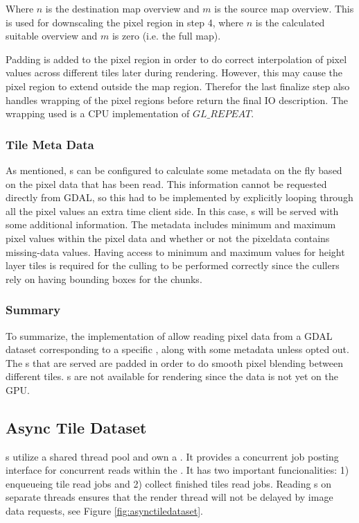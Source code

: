 Where $n$ is the destination map overview and $m$ is the source map overview. This is used for downscaling the pixel region in step 4, where $n$ is the calculated suitable overview and $m$ is zero (i.e. the full map). 

Padding is added to the pixel region in order to do correct interpolation of pixel values across different tiles later during rendering. However, this may cause the pixel region to extend outside the map region. Therefor the last finalize step also handles wrapping of the pixel regions before return the final IO description. The wrapping used is a CPU implementation of $GL\_REPEAT$.

\subsubsection{Tile Meta Data}
As mentioned, s can be configured to calculate some metadata on the fly based on the pixel data that has been read. This information cannot be requested directly from GDAL, so this had to be implemented by explicitly looping through all the pixel values an extra time client side. In this case, s will be served with some additional information. The metadata includes minimum and maximum pixel values within the pixel data and whether or not the pixeldata contains missing-data values. Having access to minimum and maximum values for height layer tiles is required for the culling to be performed correctly since the cullers rely on having bounding boxes for the chunks.

\subsubsection{Summary}
To summarize, the implementation of  allow reading pixel data from a GDAL dataset corresponding to a specific , along with some metadata unless opted out. The s that are served are padded in order to do smooth pixel blending between different tiles. s are not available for rendering since the data is not yet on the GPU.

\subsection{Async Tile Dataset}
s utilize a shared thread pool and own a . It provides a concurrent job posting interface for concurrent reads within the . It has two important funcionalities: 1) enqueueing tile read jobs and 2) collect finished tiles read jobs. Reading s on separate threads ensures that the render thread will not be delayed by image data requests, see Figure \ref{fig:asynctiledataset}.

